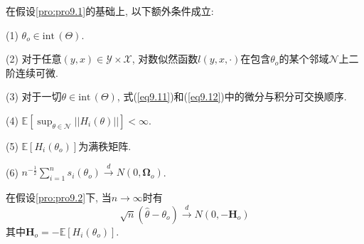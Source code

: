 \documentclass[cn, 12pt, math=mtpro2, bibstyle=apa, blue, twocol]{elegantbook}
\newcommand{\E}{\mathbb{E}}
\newcommand{\BO}{\mathbold{\Omega}}
\begin{document}
\begin{proposition}\label{pro:pro9.2}
在假设\ref{pro:pro9.1}的基础上, 以下额外条件成立:

(1) $\theta_o\in\text{int}\,(\Theta)$.

(2) 对于任意$(y,x)\in\mathscr{Y}\times\mathscr{X}$, 对数似然函数$l(y,x,\cdot)$在包含$\theta_o$的某个邻域$\mathscr{N}$上二阶连续可微.

(3) 对于一切$\theta\in\text{int}\,(\Theta)$, 式(\ref{eq9.11})和(\ref{eq9.12})中的微分与积分可交换顺序.

(4) $\E[\sup_{\theta\in\mathscr{N}}||H_i(\theta)||]<\infty$.

(5) $\E[H_i(\theta_o)]$为满秩矩阵.

(6) $n^{-\frac{1}{2}}\sum_{i=1}^{n}s_i(\theta_o)\xrightarrow{d} N(0,\BO_o)$.
\end{proposition}
\begin{theorem}
  在假设\ref{pro:pro9.2}下, 当$n\to\infty$时有
  $$\sqrt{n}(\hat{\theta}-\theta_o)\xrightarrow{d} N(0,-\mathbold{H}_o)$$
  其中$\mathbold{H}_o=-\E[H_i(\theta_o)]$.
\end{theorem}
\end{document}
